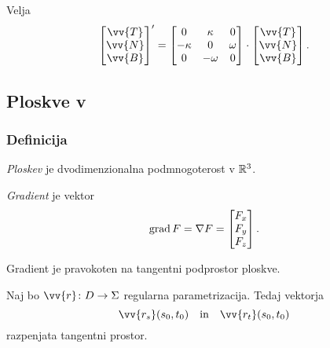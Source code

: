 \begin{izrek}
Velja
\[
\begin{bmatrix}
\vv{T} \\
\vv{N} \\
\vv{B}
\end{bmatrix}' =
\begin{bmatrix}
0       & \kappa  & 0      \\
-\kappa & 0       & \omega \\
0       & -\omega & 0
\end{bmatrix}
\cdot
\begin{bmatrix}
\vv{T} \\
\vv{N} \\
\vv{B}
\end{bmatrix}.
\]
\end{izrek}

\newpage

\subsection{Ploskve v }

\subsubsection{Definicija}


\begin{definicija}
\emph{Ploskev} je dvodimenzionalna podmnogoterost v
$\mathbb{R}^3$.
\end{definicija}

\begin{definicija}
\emph{Gradient} je vektor
\[
\operatorname{grad} F = \nabla F =
\begin{bmatrix}
F_x \\
F_y \\
F_z
\end{bmatrix}.
\]
\end{definicija}

\begin{trditev}
Gradient je pravokoten na tangentni podprostor ploskve.
\end{trditev}

\obvs

\begin{trditev}
Naj bo $\vv{r} \colon D \to \Sigma$ regularna parametrizacija.
Tedaj vektorja
\[
\vv{r_s}(s_0,t_0)
\quad \text{in} \quad
\vv{r_t}(s_0,t_0)
\]
razpenjata tangentni prostor.
\end{trditev}

